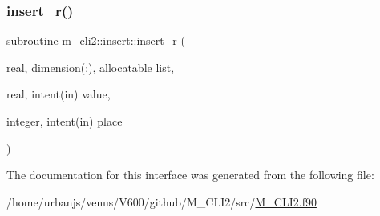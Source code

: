 \mbox{\label{interfacem__cli2_1_1insert_a647342bf6669248878fd990a9d92ef2e}} 
\subsubsection{\texorpdfstring{insert\+\_\+r()}{insert\_r()}}
{\footnotesize\ttfamily subroutine m\+\_\+cli2\+::insert\+::insert\+\_\+r (\begin{DoxyParamCaption}\item[{real, dimension(\+:), allocatable}]{list,  }\item[{real, intent(in)}]{value,  }\item[{integer, intent(in)}]{place }\end{DoxyParamCaption})\hspace{0.3cm}{\ttfamily [private]}}



The documentation for this interface was generated from the following file\+:\begin{DoxyCompactItemize}
\item 
/home/urbanjs/venus/\+V600/github/\+M\+\_\+\+C\+L\+I2/src/\mbox{\hyperlink{M__CLI2_8f90}{M\+\_\+\+C\+L\+I2.\+f90}}\end{DoxyCompactItemize}
